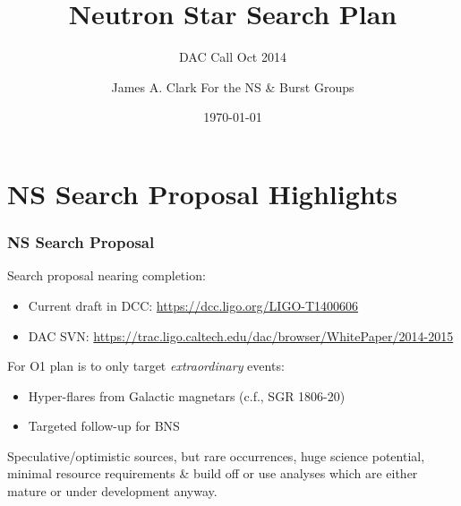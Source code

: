 \documentclass{beamer}
\begin{document}
\title{Neutron Star Search Plan}
\subtitle{DAC Call Oct 2014}  
\author{James A. Clark For the NS \& Burst Groups}
\date{\today} 

\begin{frame}[plain]
\titlepage
\end{frame}



\section{NS Search Proposal Highlights}

\begin{frame}
    \frametitle{NS Search Proposal}
    Search proposal nearing completion:
    \begin{itemize}
        \item Current draft in DCC: {\small \href{https://dcc.ligo.org/LIGO-T1400606}{https://dcc.ligo.org/LIGO-T1400606}}
        \item DAC SVN:
            {\small \href{https://trac.ligo.caltech.edu/dac/browser/WhitePaper/2014-2015}
            {https://trac.ligo.caltech.edu/dac/browser/WhitePaper/2014-2015}}
    \end{itemize}
    For O1 plan is to only target \emph{extraordinary} events:
    \begin{itemize}
        \item Hyper-flares from Galactic magnetars (c.f., SGR 1806-20)
        \item Targeted follow-up for BNS
    \end{itemize}
    Speculative/optimistic sources, but rare occurrences, huge
    science potential, minimal resource requirements \& build off or use
    analyses which are either mature or under development anyway.
\end{frame}
\end{document}
